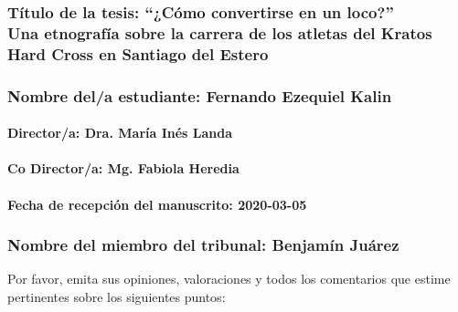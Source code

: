 \subsubsection*{Título de la tesis: 
``¿Cómo convertirse en un loco?''  \\
Una etnografía sobre la carrera de los atletas del Kratos Hard Cross en Santiago del Estero}
\label{tuxedtulo-de-la-tesis-cuxf3mo-convertirse-en-un-loco-una-etnografuxeda-sobre-la-carrera-de-los-atletas-del-kratos-hard-cross-en-santiago-del-estero}

\subsubsection*{Nombre del/a estudiante: Fernando Ezequiel Kalin}\label{nombre-dela-estudiantefernando-ezequiel-kalin}

\paragraph{Director/a: Dra. María Inés Landa}\label{directora-dra.-maruxeda-inuxe9s-landa}

\paragraph{Co Director/a: Mg. Fabiola Heredia}\label{co-directora-mg.-fabiola-heredia}

\paragraph{Fecha de recepción del manuscrito: 2020-03-05}\label{fecha-de-recepciuxf3n-del-manuscrito-2020-03-05}

\subsubsection*{Nombre del miembro del tribunal: Benjamín Juárez}\label{nombre-del-miembro-del-tribunal-benjamuxedn-juuxe1rez}

% 

Por favor, emita sus opiniones, valoraciones y todos los comentarios que
estime pertinentes sobre los siguientes puntos: